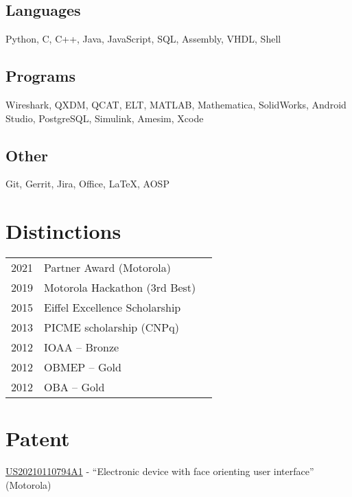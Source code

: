 \documentclass[]{deedy-resume}
\begin{document}
\begin{minipage}[t]{0.33\textwidth}
\subsection{Languages}
Python, C, C++, Java, JavaScript, 
SQL, Assembly, VHDL, Shell 
\sectionsep

\subsection{Programs}
Wireshark, QXDM, QCAT, ELT, MATLAB, 
Mathematica, SolidWorks, Android Studio,
PostgreSQL, Simulink, Amesim, Xcode
\sectionsep

\subsection{Other}
Git, Gerrit, Jira, Office, LaTeX, AOSP


\section{Distinctions} 
\begin{tabular}{rll}
2021         & Partner Award (Motorola)\\
2019         & Motorola Hackathon (3rd Best)\\
2015	     & Eiffel Excellence Scholarship\\
2013         & PICME scholarship (CNPq)\\
2012	     & IOAA -- Bronze\\
2012	     & OBMEP -- Gold\\
2012	     & OBA -- Gold \\
\end{tabular}
\sectionsep

\section{Patent}
\href{https://patents.google.com/patent/US20210110794A1/}{US20210110794A1} - ``Electronic device with face orienting user interface'' (Motorola)
\sectionsep

%
%

\end{minipage} 
\end{document}
